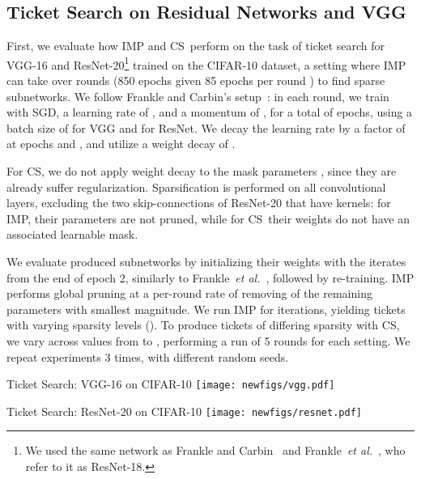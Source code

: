 \documentclass{article}
\newcommand{\citet}[1]{\cite{#1}}
\newcommand{\etal}{\textit{et al.}}
\newcommand{\methodacro}{CS}
\begin{document}
\subsection{Ticket Search on Residual Networks and VGG}
\label{sec:resnet}

First, we evaluate how IMP and \methodacro~perform on the task of ticket search for VGG-16 \cite{vgg} and ResNet-20\footnote{We used the same network as Frankle and Carbin~\citet{lth} and Frankle~\etal~\citet{lth2}, who refer to it as ResNet-18.} \cite{resnet1} trained on the CIFAR-10 dataset, a setting where IMP can take over  rounds (850 epochs given 85 epochs per round \cite{lth2}) to find sparse subnetworks. We follow Frankle and Carbin's setup~\citet{lth}: in each round, we train with SGD, a learning rate of , and a momentum of , for a total of  epochs, using a batch size of  for VGG and  for ResNet. We decay the learning rate by a factor of  at epochs  and , and utilize a weight decay of .

For \methodacro, we do not apply weight decay to the mask parameters , since they are already suffer  regularization. Sparsification is performed on all convolutional layers, excluding the two skip-connections of ResNet-20 that have  kernels: for IMP, their parameters are not pruned, while for \methodacro~their weights do not have an associated learnable mask.

We evaluate produced subnetworks by initializing their weights with the iterates from the end of epoch 2, similarly to Frankle~\etal~\citet{lth2}, followed by re-training. IMP performs global pruning at a per-round rate of removing  of the remaining parameters with smallest magnitude. We run IMP for  iterations, yielding  tickets with varying sparsity levels (). To produce tickets of differing sparsity with \methodacro, we vary  across  values from  to , performing a run of 5 rounds for each setting. We repeat experiments 3 times, with different random seeds.

\begin{figure*}[!bt]
    \centering
    \begin{minipage}[l]{0.49\linewidth}
      \centering
      \tiny{\textsf{Ticket Search: VGG-16 on CIFAR-10}}
      \texttt{[image: newfigs/vgg.pdf]}
    \end{minipage}
    \hfill
    \begin{minipage}[l]{0.49\linewidth}
      \centering
      \tiny{\textsf{Ticket Search: ResNet-20 on CIFAR-10}}
      \texttt{[image: newfigs/resnet.pdf]}
    \end{minipage}
    \vspace{-5pt}
    \caption{Test accuracy and sparsity of subnetworks produced by IMP and \methodacro~after re-training from weights of epoch 2. Purple curves show individual runs of \methodacro, while the green curve connects tickets produced after 5 rounds of CS with varying . Iterative Magnitude Pruning (continued) refers to IMP without rewinding between rounds. Error bars depict variance across 3 runs.}
    \label{fig:tickets}
\end{figure*}
\end{document}
